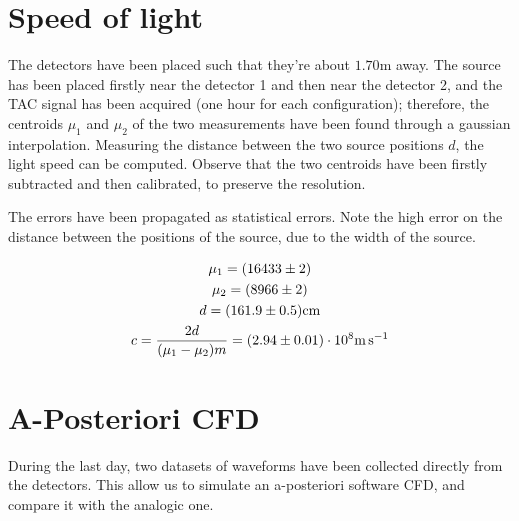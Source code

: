 \documentclass[11pt,a4 paper]{article}
\let\oldfrac\frac
\renewcommand{\frac}[3][d]{\ifthenelse{\equal{#1}{d}}{\oldfrac{#2}{#3}}{\nicefrac{#2}{#3}}}
\begin{document}
\section{Speed of light}
The detectors have been placed such that they're about $1.70\si{\metre}$ away. The source has been placed firstly near the detector 1 and then near the detector 2, and the TAC signal has been acquired (one hour for each configuration); therefore, the centroids $\mu_1$ and $\mu_2$ of the two measurements have been found through a gaussian interpolation. Measuring the distance between the two source positions $d$, the light speed can be computed. Observe that the two centroids have been firstly subtracted and then calibrated, to preserve the resolution.

The errors have been propagated as statistical errors. Note the high error on the distance between the positions of the source, due to the width of the source.

\begin{gather*}
    \mu_1 = (16433 \pm 2) \\
    \mu_2 = (8966 \pm 2) \\
    d = (161.9 \pm 0.5) \si{\centi\metre} \\
    c = \frac{2d}{(\mu_1-\mu_2)m} = (2.94 \pm 0.01 )\cdot 10^8 \si{\metre\per\second}
\end{gather*}


\section{A-Posteriori CFD}
During the last day, two datasets of waveforms have been collected directly from the detectors. This allow us to simulate an a-posteriori software CFD, and compare it with the analogic one.
\end{document}
